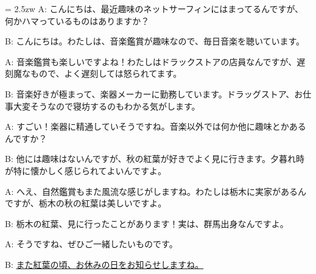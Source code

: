 \documentclass[11pt]{amsart}
\title{}
\author{}
\newenvironment{hangall}[1]{\hangindent = 2.5zw\everypar{\hangindent = 2.5zw}}{}
\begin{document}
\maketitle
\begin{hangall}{}%
A: こんにちは、最近趣味のネットサーフィンにはまってるんですが、何かハマっているものはありますか？

B: こんにちは。わたしは、音楽鑑賞が趣味なので、毎日音楽を聴いています。

A: 音楽鑑賞も楽しいですよね！わたしはドラックストアの店員なんですが、遅刻魔なもので、よく遅刻しては怒られてます。

B: 音楽好きが極まって、楽器メーカーに勤務しています。ドラッグストア、お仕事大変そうなので寝坊するのもわかる気がします。

A: すごい！楽器に精通していそうですね。音楽以外では何か他に趣味とかあるんですか？

B: 他には趣味はないんですが、秋の紅葉が好きでよく見に行きます。夕暮れ時が特に懐かしく感じられてよいんですよ。

A: へえ、自然鑑賞もまた風流な感じがしますね。わたしは栃木に実家があるんですが、栃木の秋の紅葉は美しいですよ。

B: 栃木の紅葉、見に行ったことがあります！実は、群馬出身なんですよ。

A: そうですね、ぜひご一緒したいものです。

B: \ul{また紅葉の頃、お休みの日をお知らせしますね。}\end{hangall}
\end{document}
